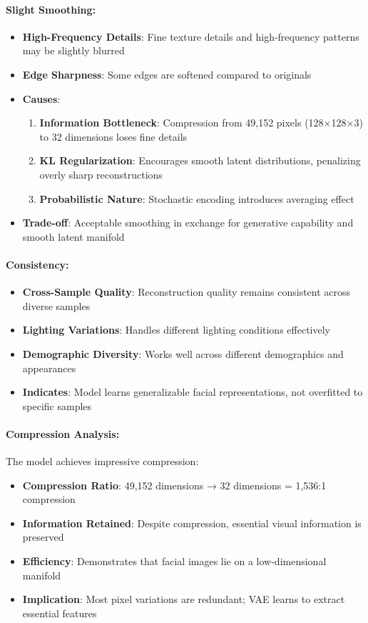 \documentclass[conference]{IEEEtran}
\begin{document}
\paragraph{Slight Smoothing:}
\begin{itemize}
    \item \textbf{High-Frequency Details}: Fine texture details and high-frequency patterns may be slightly blurred
    \item \textbf{Edge Sharpness}: Some edges are softened compared to originals
    \item \textbf{Causes}:
    \begin{enumerate}
        \item \textbf{Information Bottleneck}: Compression from 49,152 pixels (128×128×3) to 32 dimensions loses fine details
        \item \textbf{KL Regularization}: Encourages smooth latent distributions, penalizing overly sharp reconstructions
        \item \textbf{Probabilistic Nature}: Stochastic encoding introduces averaging effect
    \end{enumerate}
    \item \textbf{Trade-off}: Acceptable smoothing in exchange for generative capability and smooth latent manifold
\end{itemize}

\paragraph{Consistency:}
\begin{itemize}
    \item \textbf{Cross-Sample Quality}: Reconstruction quality remains consistent across diverse samples
    \item \textbf{Lighting Variations}: Handles different lighting conditions effectively
    \item \textbf{Demographic Diversity}: Works well across different demographics and appearances
    \item \textbf{Indicates}: Model learns generalizable facial representations, not overfitted to specific samples
\end{itemize}

\paragraph{Compression Analysis:}
The model achieves impressive compression:
\begin{itemize}
    \item \textbf{Compression Ratio}: 49,152 dimensions → 32 dimensions = 1,536:1 compression
    \item \textbf{Information Retained}: Despite compression, essential visual information is preserved
    \item \textbf{Efficiency}: Demonstrates that facial images lie on a low-dimensional manifold
    \item \textbf{Implication}: Most pixel variations are redundant; VAE learns to extract essential features
\end{itemize}
\end{document}

